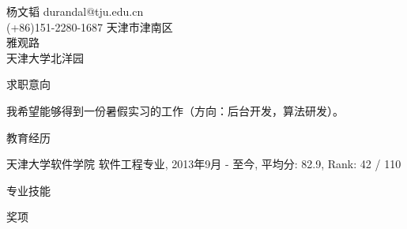 \documentclass[A4,12pt]{article}
\begin{document}
\header
{杨文韬}
{durandal@tju.edu.cn \\ (+86)151-2280-1687}
{天津市津南区\\
雅观路\\
天津大学北洋园}


\begin{statementblock}{求职意向}

我希望能够得到一份暑假实习的工作（方向：后台开发，算法研发）。

\bigskip
\end{statementblock}


\begin{resumeblock}{教育经历}

{{天津大学}{软件学院 软件工程专业}, 2013年9月 - 至今, 
{平均分: 82.9},  { Rank: 42 / 110}
}

\end{resumeblock}


\begin{resumeblock}{专业技能}
 




\end{resumeblock}


\begin{resumeblock}{奖项}




\end{resumeblock}
\end{document}
